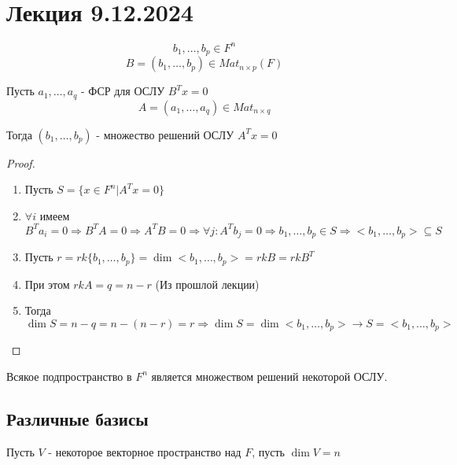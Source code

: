 \section{Лекция 9.12.2024}


\begin{proposal}
    
    $$b_1, \dots, b_p \in F^n$$
    $$B = \left(b_1, \dots, b_p\right) \in Mat_{n \times p}(F)$$

    Пусть $a_1, \dots, a_q$ - ФСР для ОСЛУ $B^Tx = 0$
    $$A = \left(a_1, \dots, a_q\right) \in Mat_{n \times q}$$

    Тогда $(b_1, \dots, b_p)$ - множество решений ОСЛУ $A^Tx = 0$

    \begin{proof}~

        \begin{enumerate}
            \item Пусть $S = \{x \in F^n | A^Tx = 0\}$
            \item $\forall i$ имеем $B^Ta_i = 0 \Rightarrow B^TA = 0 \Rightarrow A^TB = 0 \Rightarrow \forall j: A^Tb_j = 0 \Rightarrow b_1, \dots, b_p \in S \Rightarrow <b_1, \dots, b_p> \subseteq S$
            \item Пусть $r = rk\{b_1, \dots, b_p\} = \dim<b_1, \dots, b_p> = rk B = rk B^T$
            \item При этом $rk A = q = n - r$ (Из прошлой лекции)
            \item Тогда $\dim S = n - q = n - (n - r) = r \Rightarrow \dim S = \dim<b_1, \dots, b_p> \rightarrow S = <b_1, \dots, b_p>$
        \end{enumerate}
        
    \end{proof}

    \begin{corollary}
        
        Всякое подпространство в $F^n$ является множеством решений некоторой ОСЛУ.

    \end{corollary}

\end{proposal}


\bigskip


\subsection{Различные базисы}


Пусть $V$ - некоторое векторное пространство над $F$, пусть $\dim V = n$


